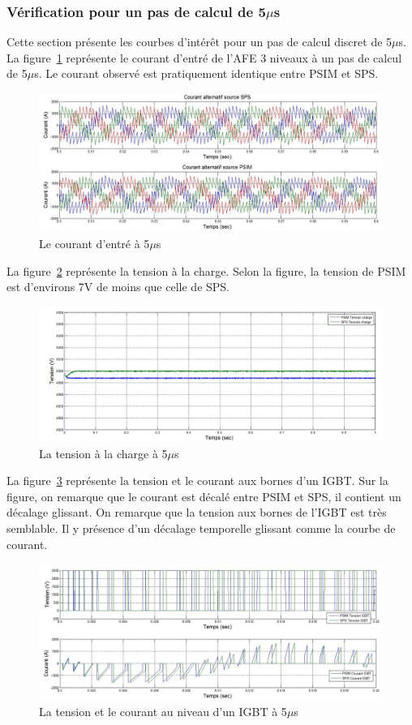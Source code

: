 \documentclass[11pt,letterpaper,final]{report}
\begin{document}
\subsubsection{Vérification pour un pas de calcul de 5$\mu$s}
Cette section présente les courbes d'intérêt pour un pas de calcul discret de 5$\mu$s. La figure~\ref{AF_3_cou5} représente le courant d'entré de l'AFE 3 niveaux à un pas de calcul de 5$\mu$s. Le courant observé est pratiquement identique entre PSIM et SPS.
\begin{figure}[htb]
\centering
\includegraphics[scale=0.5]{Fig/AFE3LEVEL/5u/cour_al.jpg}
\caption{Le courant d'entré à 5$\mu$s}
\label{AF_3_cou5}
\end{figure}
La figure~\ref{AF_3_vch5} représente la tension à la charge. Selon la figure, la tension de PSIM est d'environs 7V de moins que celle de SPS.
\begin{figure}[htb]
\centering
\includegraphics[scale=0.5]{Fig/AFE3LEVEL/5u/vch.jpg}
\caption{La tension à la charge à 5$\mu$s}
\label{AF_3_vch5}
\end{figure}
La figure~\ref{AF_3_IGBT5} représente la tension et le courant aux bornes d'un IGBT. Sur la figure, on remarque que le courant est décalé entre PSIM et SPS, il contient un décalage glissant. On remarque que la tension aux bornes de l'IGBT est très semblable. Il y présence d'un décalage temporelle glissant comme la courbe de courant.

\begin{figure}[htb]
\centering
\includegraphics[scale=0.5]{Fig/AFE3LEVEL/5u/IGBT.jpg}
\caption{La tension et le courant au niveau d'un IGBT à 5$\mu$s}
\label{AF_3_IGBT5}
\end{figure}
\end{document}

